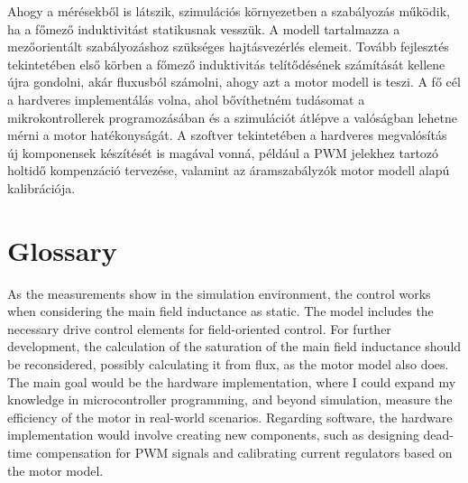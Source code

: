\documentclass[a4paper,12pt]{article}
\begin{document}
	Ahogy a mérésekből is látszik, szimulációs környezetben a szabályozás működik, ha a főmező induktivitást statikusnak vesszük. A modell tartalmazza a mezőorientált szabályozáshoz szükséges hajtásvezérlés elemeit. Tovább fejlesztés tekintetében első körben a főmező induktivitás telítődésének számítását kellene újra gondolni, akár fluxusból számolni, ahogy azt a motor modell is teszi. A fő cél a hardveres implementálás volna, ahol bővíthetném tudásomat a mikrokontrollerek programozásában és a szimulációt átlépve a valóságban lehetne mérni a motor hatékonyságát. A szoftver tekintetében a hardveres megvalósítás új komponensek készítését is magával vonná, például a PWM jelekhez tartozó holtidő kompenzáció tervezése, valamint az áramszabályzók motor modell alapú kalibrációja.
	
	\pagebreak
	\section{Glossary}
	
	As the measurements show in the simulation environment, the control works when considering the main field inductance as static. The model includes the necessary drive control elements  for field-oriented control. For further development, the calculation of the saturation of the main field inductance should be reconsidered, possibly calculating it from flux, as the motor model also does. The main goal would be the hardware implementation, where I could expand my knowledge in microcontroller programming, and beyond simulation, measure the efficiency of the motor in real-world scenarios. Regarding software, the hardware implementation would involve creating new components, such as designing dead-time compensation for PWM signals and calibrating current regulators based on the motor model.
	
\end{document}
